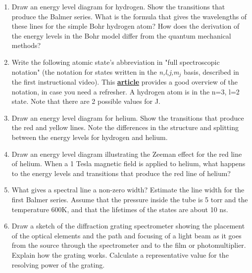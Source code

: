 \documentclass{../signatures}
\begin{document}
\maketitle

\names

\prelab

\begin{enumerate}

    \item Draw an energy level diagram for hydrogen. Show the transitions that produce the Balmer series. What is the formula that gives the wavelengths of these lines for the simple Bohr hydrogen atom? How does the derivation of the energy levels in the Bohr model differ from the quantum mechanical methods?
    
    \item Write the following atomic state's abbreviation in "full spectroscopic notation" (the notation for states written in the \emph{n,l,j,m$_j$} basis, described in the first instructional video). This \href{http://www.physics.byu.edu/faculty/bergeson/physics571/notes/L27spectnotation.pdf}{\textbf{article}} provides a good overview of the notation, in case you need a refresher. A hydrogen atom is in the n=3, l=2 state. Note that there are 2 possible values for J. 

    \item Draw an energy level diagram for helium. Show the transitions that produce the red and yellow lines. Note the differences in the structure and splitting between the energy levels for hydrogen and helium.

    \item Draw an energy level diagram illustrating the Zeeman effect for the red line of helium. When a 1 Tesla magnetic field is applied to helium, what happens to the energy levels and transitions that produce the red line of helium?

    \item What gives a spectral line a non-zero width? Estimate the line width for the first Balmer series. Assume that the pressure inside the tube is 5 torr and the temperature 600K, and that the lifetimes of the states are about 10 ns.

    \item Draw a sketch of the diffraction grating spectrometer showing the placement of the optical elements and the path and focusing of a light beam as it goes from the source through the spectrometer and to the film or photomultiplier. Explain how the grating works. Calculate a representative value for the resolving power of the grating.


\end{enumerate}
\end{document}
